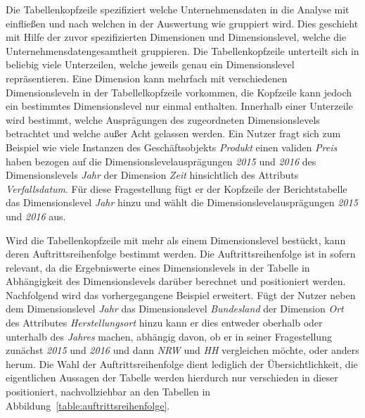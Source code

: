 \documentclass[
  language=german, %
  type=bachelor%
]{isthesis}
\begin{document}
\begin{content}
  Die Tabellenkopfzeile spezifiziert welche Unternehmensdaten in die Analyse
  mit einfließen und nach welchen in der Auswertung wie gruppiert wird. Dies
  geschieht mit Hilfe der zuvor spezifizierten Dimensionen und Dimensionslevel,
  welche die Unternehmensdatengesamtheit gruppieren. Die Tabellenkopfzeile
  unterteilt sich in beliebig viele Unterzeilen, welche jeweils genau ein
  Dimensionslevel repräsentieren. Eine Dimension kann mehrfach mit
  verschiedenen Dimensionsleveln in der Tabellelkopfzeile vorkommen, die
  Kopfzeile kann jedoch ein bestimmtes Dimensionslevel nur einmal enthalten.
  Innerhalb einer Unterzeile wird bestimmt, welche Ausprägungen des
  zugeordneten Dimensionslevels betrachtet und welche außer Acht gelassen
  werden. Ein Nutzer fragt sich zum Beispiel wie viele Instanzen des
  Geschäftsobjekts \textit{Produkt} einen validen \textit{Preis} haben bezogen
  auf die Dimensionslevelausprägungen \textit{2015} und \textit{2016} des
  Dimensionslevels \textit{Jahr} der Dimension \textit{Zeit} hinsichtlich des
  Attributs \textit{Verfallsdatum}. Für diese Fragestellung fügt er der
  Kopfzeile der Berichtstabelle das Dimensionslevel \textit{Jahr} hinzu und
  wählt die Dimensionslevelausprägungen \textit{2015} und \textit{2016} aus.

  Wird die Tabellenkopfzeile mit mehr als einem Dimensionslevel bestückt, kann
  deren Auftrittsreihenfolge bestimmt werden. Die Auftrittsreihenfolge ist in
  sofern relevant, da die Ergebniswerte eines Dimensionslevels in der Tabelle
  in Abhängigkeit des Dimensionslevels darüber berechnet und positioniert
  werden. Nachfolgend wird das vorhergegangene Beispiel erweitert. Fügt der
  Nutzer neben dem Dimensionslevel \textit{Jahr} das Dimensionslevel
  \textit{Bundesland} der Dimension \textit{Ort} des Attributes
  \textit{Herstellungsort} hinzu kann er dies entweder oberhalb oder unterhalb
  des \textit{Jahres} machen, abhängig davon, ob er in seiner Fragestellung
  zunächst \textit{2015} und \textit{2016} und dann \textit{NRW} und
  \textit{HH} vergleichen möchte, oder anders herum. Die Wahl der
  Auftrittsreihenfolge dient lediglich der Übersichtlichkeit, die eigentlichen
  Aussagen der Tabelle werden hierdurch nur verschieden in dieser positioniert,
  nachvollziehbar an den Tabellen in
  Abbildung~\ref{table:auftrittsreihenfolge}.
  

\end{content}
\end{document}
